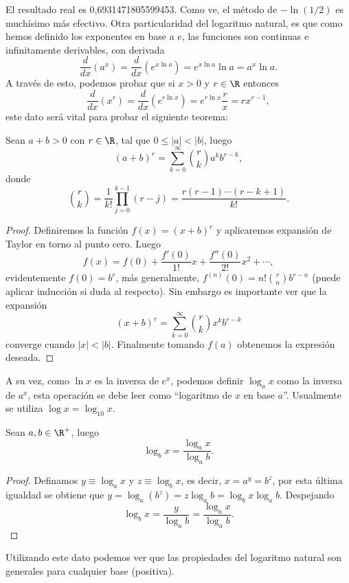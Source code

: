 \documentclass[11pt,oneside,a4paper]{book}
\begin{document}
El resultado real es 0,6931471805599453. Como ve, el método de $-\ln(1/2)$ es muchísimo más efectivo. Otra particularidad del logaritmo natural, es que como hemos definido los exponentes en base a $e$, las funciones son continuas e infinitamente derivables, con derivada
\begin{equation}
\frac{d}{dx}(a^x)=\frac{d}{dx}(e^{x\ln a})=e^{x\ln a}\ln a=a^x\ln a.
\end{equation}
A través de esto, podemos probar que si $x\gt 0$ y $r\in\R$ entonces
\begin{equation}
\frac{d}{dx}(x^r)=\frac{d}{dx}(e^{r\ln x})=e^{r\ln x}\frac{r}{x}=rx^{r-1},
\end{equation}
este dato será vital para probar el siguiente teorema:
\begin{thm}
Sean $a+b\gt 0$ con $r\in\R$, tal que $0\leq|a|\lt|b|$, luego
\begin{equation}
(a+b)^r=\sum_{k=0}^\infty\binom{r}{k}a^kb^{r-k},
\end{equation}
donde
$$\binom{r}{k}=\frac{1}{k!}\prod_{j=0}^{k-1}(r-j)=\frac{r(r-1)\cdots(r-k+1)}{k!}.$$
\end{thm}
\begin{proof}
Definiremos la función $f(x)=(x+b)^r$ y aplicaremos expansión de Taylor en torno al punto cero. Luego
$$f(x)=f(0)+\frac{f'(0)}{1!}x+\frac{f''(0)}{2!}x^2+\cdots,$$
evidentemente $f(0)=b^r$, más generalmente, $f^{(n)}(0)=n!\binom{r}{n}b^{r-n}$ (puede aplicar inducción si duda al respecto). Sin embargo es importante ver que la expansión
$$(x+b)^r=\sum_{k=0}^\infty\binom{r}{k}x^kb^{r-k}$$
converge cuando $|x|\lt|b|$. Finalmente tomando $f(a)$ obtenemos la expresión deseada.
\end{proof}
A su vez, como $\ln x$ es la inversa de $e^x$, podemos definir $\log_a x$ como la inversa de $a^x$, esta operación se debe leer como ``logaritmo de $x$ en base $a$''. Usualmente se utiliza $\log x=\log_{10}x$.
\begin{prop}
Sean $a,b\in\R^+$, luego
\begin{equation}
\log_bx=\frac{\log_a x}{\log_a b}.
\end{equation}
\end{prop}
\begin{proof}
Definamos $y\equiv\log_a x$ y $z\equiv\log_bx$, es decir, $x=a^y=b^z$, por esta última igualdad se obtiene que $y=\log_a(b^z)=z\log_ab=\log_bx\log_ab$. Despejando
$$\log_bx=\frac{y}{\log_ab}=\frac{\log_ax}{\log_ab}.$$
\end{proof}
Utilizando este dato podemos ver que las propiedades del logaritmo natural son generales para cualquier base (positiva).
\end{document}

